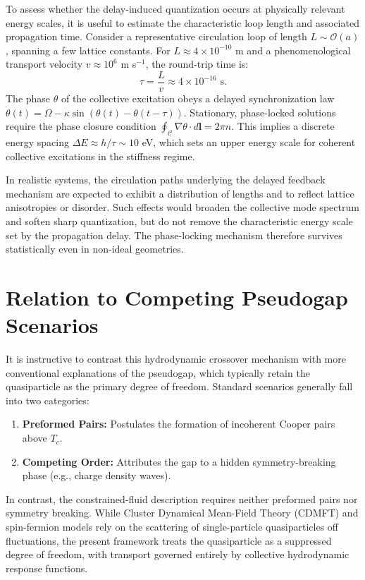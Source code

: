\documentclass[11pt, a4paper]{article}
\begin{document}
                To assess whether the delay-induced quantization occurs at physically relevant energy scales, it is useful to estimate the characteristic loop length and associated propagation time. Consider a representative circulation loop of length $L \sim \mathcal{O}(a)$, spanning a few lattice constants. For $L \approx 4 \times 10^{-10}$ m and a phenomenological transport velocity $v \approx 10^6$ m s$^{-1}$, the round-trip time is:
                \begin{equation}
                    \tau = \frac{L}{v} \approx 4 \times 10^{-16} \text{ s}.
                \end{equation}
                The phase $\theta$ of the collective excitation obeys a delayed synchronization law $\dot{\theta}(t) = \Omega - \kappa \sin(\theta(t) - \theta(t - \tau))$. Stationary, phase-locked solutions require the phase closure condition $\oint_{\mathcal{C}} \nabla \theta \cdot d\mathbf{l} = 2\pi n$. This implies a discrete energy spacing $\Delta E \approx h/\tau \sim 10$ eV, which sets an upper energy scale for coherent collective excitations in the stiffness regime.

            In realistic systems, the circulation paths underlying the delayed feedback mechanism are expected to exhibit a distribution of lengths and to reflect lattice anisotropies or disorder. Such effects would broaden the collective mode spectrum and soften sharp quantization, but do not remove the characteristic energy scale set by the propagation delay. The phase-locking mechanism therefore survives statistically even in non-ideal geometries.

        \section{Relation to Competing Pseudogap Scenarios}

            It is instructive to contrast this hydrodynamic crossover mechanism with more conventional explanations of the pseudogap, which typically retain the quasiparticle as the primary degree of freedom. Standard scenarios generally fall into two categories:
            \begin{enumerate}
                \item \textbf{Preformed Pairs:} Postulates the formation of incoherent Cooper pairs above $T_c$.
                \item \textbf{Competing Order:} Attributes the gap to a hidden symmetry-breaking phase (e.g., charge density waves).
            \end{enumerate}
            In contrast, the constrained-fluid description requires neither preformed pairs nor symmetry breaking. While Cluster Dynamical Mean-Field Theory (CDMFT) and spin-fermion models \cite{Norman1998} rely on the scattering of single-particle quasiparticles off fluctuations, the present framework treats the quasiparticle as a suppressed degree of freedom, with transport governed entirely by collective hydrodynamic response functions.
\end{document}
